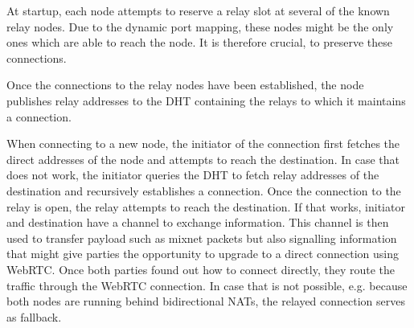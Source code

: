 At startup, each node attempts to reserve a relay slot at several of the known relay nodes. Due to the dynamic port mapping, these nodes might be the only ones which are able to reach the node. It is therefore crucial, to preserve these connections.

Once the connections to the relay nodes have been established, the node publishes relay addresses to the DHT containing the relays to which it maintains a connection.

When connecting to a new node, the initiator of the connection first fetches the direct addresses of the node and attempts to reach the destination. In case that does not work, the initiator queries the DHT to fetch relay addresses of the destination and recursively establishes a connection. Once the connection to the relay is open, the relay attempts to reach the destination. If that works, initiator and destination have a channel to exchange information. This channel is then used to transfer payload such as mixnet packets but also signalling information that might give parties the opportunity to upgrade to a direct connection using WebRTC. Once both parties found out how to connect directly, they route the traffic through the WebRTC connection. In case that is not possible, e.g. because both nodes are running behind bidirectional NATs, the relayed connection serves as fallback.

